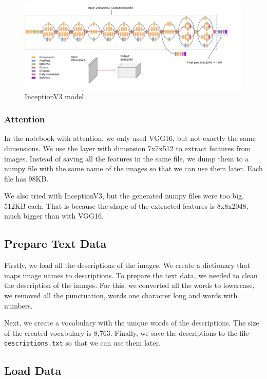\documentclass{article} %
\begin{document}
\begin{figure}[ht]
\centering
\includegraphics[width=\textwidth]{inceptionv3.png}
\caption{InceptionV3 model} 
\label{InceptionV3}
\end{figure}

\subsubsection{Attention}
In the notebook with attention, we only used VGG16, but not exactly the same dimensions. We use the layer with dimension 7x7x512 to extract features from images. Instead of saving all the features in the same file, we dump them to a numpy file with the same name of the images so that we can use them later. Each file has 98KB.

We also tried with InceptionV3, but the generated numpy files were too big, 512KB each. That is because the shape of the extracted features is 8x8x2048, much bigger than with VGG16.

\subsection{Prepare Text Data}

Firstly, we load all the descriptions of the images. We create a dictionary that maps image names to descriptions. To prepare the text data, we needed to clean the description of the images. For this, we converted all the words to lowercase, we removed all the punctuation, words one character long and words with numbers. 

Next, we create a vocabulary with the unique words of the descriptions. The size of the created vocabulary is 8,763. Finally, we save the descriptions to the file \texttt{descriptions.txt} so that we can use them later.

\subsection{Load Data}
\end{document}
